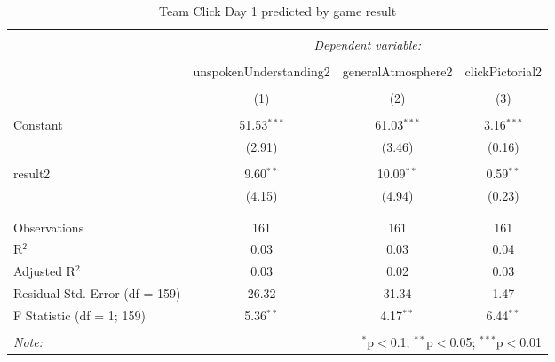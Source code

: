 
\begin{table}[!htbp] \centering 
  \caption{Team Click Day 1 predicted by game result} 
  \label{tab:teamClickDay1Result} 
\footnotesize 
\begin{tabular}{@{\extracolsep{5pt}}lccc} 
\\[-1.8ex]\hline 
\hline \\[-1.8ex] 
 & \multicolumn{3}{c}{\textit{Dependent variable:}} \\ 
\cline{2-4} 
\\[-1.8ex] & unspokenUnderstanding2 & generalAtmosphere2 & clickPictorial2 \\ 
\\[-1.8ex] & (1) & (2) & (3)\\ 
\hline \\[-1.8ex] 
 Constant & 51.53$^{***}$ & 61.03$^{***}$ & 3.16$^{***}$ \\ 
  & (2.91) & (3.46) & (0.16) \\ 
  & & & \\ 
 result2 & 9.60$^{**}$ & 10.09$^{**}$ & 0.59$^{**}$ \\ 
  & (4.15) & (4.94) & (0.23) \\ 
  & & & \\ 
\hline \\[-1.8ex] 
Observations & 161 & 161 & 161 \\ 
R$^{2}$ & 0.03 & 0.03 & 0.04 \\ 
Adjusted R$^{2}$ & 0.03 & 0.02 & 0.03 \\ 
Residual Std. Error (df = 159) & 26.32 & 31.34 & 1.47 \\ 
F Statistic (df = 1; 159) & 5.36$^{**}$ & 4.17$^{**}$ & 6.44$^{**}$ \\ 
\hline 
\hline \\[-1.8ex] 
\textit{Note:}  & \multicolumn{3}{r}{$^{*}$p$<$0.1; $^{**}$p$<$0.05; $^{***}$p$<$0.01} \\ 
\end{tabular} 
\end{table} 

